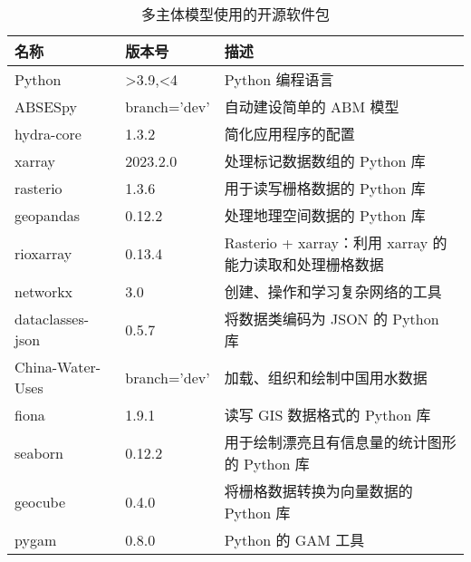 \begin{table}[htbp]
    \centering
    \caption{多主体模型使用的开源软件包}
      \begin{tabularx}{0.8\textwidth}{p{1.5cm} p{1.5cm} L}
        \toprule
      名称    & 版本号   & 描述 \\
      \midrule
      Python & >3.9,<4 & Python 编程语言 \\
      ABSESpy & branch='dev' & 自动建设简单的 ABM 模型 \\
      hydra-core & 1.3.2 & 简化应用程序的配置 \\
      xarray & 2023.2.0 & 处理标记数据数组的 Python 库 \\
      rasterio & 1.3.6 & 用于读写栅格数据的 Python 库 \\
      geopandas & 0.12.2 & 处理地理空间数据的 Python 库 \\
      rioxarray & 0.13.4 & Rasterio + xarray：利用 xarray 的能力读取和处理栅格数据 \\
      networkx & 3.0 & 创建、操作和学习复杂网络的工具 \\
      dataclasses-json & 0.5.7 & 将数据类编码为 JSON 的 Python 库 \\
      China-Water-Uses & branch='dev' & 加载、组织和绘制中国用水数据 \\
      fiona & 1.9.1 & 读写 GIS 数据格式的 Python 库 \\
      seaborn & 0.12.2 & 用于绘制漂亮且有信息量的统计图形的 Python 库 \\
      geocube & 0.4.0 & 将栅格数据转换为向量数据的 Python 库 \\
      pygam & 0.8.0 & Python 的 GAM 工具 \\
      \bottomrule
      \end{tabularx}%
    \label{ch6:tab:packages}%
  \end{table}%
  